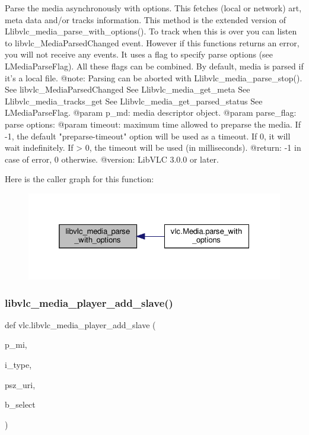\begin{DoxyVerb}Parse the media asynchronously with options.
This fetches (local or network) art, meta data and/or tracks information.
This method is the extended version of L{libvlc_media_parse_with_options}().
To track when this is over you can listen to libvlc_MediaParsedChanged
event. However if this functions returns an error, you will not receive any
events.
It uses a flag to specify parse options (see L{MediaParseFlag}). All
these flags can be combined. By default, media is parsed if it's a local
file.
@note: Parsing can be aborted with L{libvlc_media_parse_stop}().
See libvlc_MediaParsedChanged
See L{libvlc_media_get_meta}
See L{libvlc_media_tracks_get}
See L{libvlc_media_get_parsed_status}
See L{MediaParseFlag}.
@param p_md: media descriptor object.
@param parse_flag: parse options:
@param timeout: maximum time allowed to preparse the media. If -1, the default "preparse-timeout" option will be used as a timeout. If 0, it will wait indefinitely. If > 0, the timeout will be used (in milliseconds).
@return: -1 in case of error, 0 otherwise.
@version: LibVLC 3.0.0 or later.
\end{DoxyVerb}
 Here is the caller graph for this function\+:
\nopagebreak
\begin{figure}[H]
\begin{center}
\leavevmode
\includegraphics[width=325pt]{namespacevlc_ac6734416f4493c5b44911e1ad49d0444_icgraph}
\end{center}
\end{figure}
\mbox{\label{namespacevlc_a1b31a681e5dab5d45ec9c0ed1badd839}} 
\subsubsection{\texorpdfstring{libvlc\+\_\+media\+\_\+player\+\_\+add\+\_\+slave()}{libvlc\_media\_player\_add\_slave()}}
{\footnotesize\ttfamily def vlc.\+libvlc\+\_\+media\+\_\+player\+\_\+add\+\_\+slave (\begin{DoxyParamCaption}\item[{}]{p\+\_\+mi,  }\item[{}]{i\+\_\+type,  }\item[{}]{psz\+\_\+uri,  }\item[{}]{b\+\_\+select }\end{DoxyParamCaption})}

